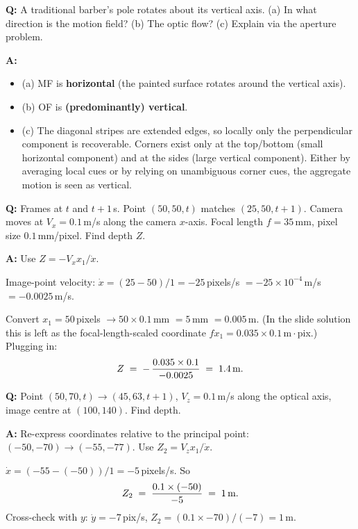 \begin{exbox}
\textbf{Q:} A traditional barber's pole rotates about its vertical axis. (a) In what direction is the motion field? (b) The optic flow? (c) Explain via the aperture problem.

\textbf{A:}
\begin{itemize}
  \item (a) MF is \textbf{horizontal} (the painted surface rotates around the vertical axis).
  \item (b) OF is \textbf{(predominantly) vertical}.
  \item (c) The diagonal stripes are extended edges, so locally only the perpendicular component is recoverable. Corners exist only at the top/bottom (small horizontal component) and at the sides (large vertical component). Either by averaging local cues or by relying on unambiguous corner cues, the aggregate motion is seen as vertical.
\end{itemize}
\end{exbox}

\begin{exbox}
\textbf{Q:} Frames at $t$ and $t+1$\,s. Point $(50,50,t)$ matches $(25,50,t+1)$. Camera moves at $V_x = 0.1$\,m/s along the camera $x$-axis. Focal length $f = 35$\,mm, pixel size $0.1$\,mm/pixel. Find depth $Z$.

\textbf{A:} Use $Z = -V_x x_1 / \dot{x}$.

Image-point velocity: $\dot{x} = (25 - 50)/1 = -25$\,pixels/s $= -25 \times 10^{-4}$\,m/s $= -0.0025$\,m/s.

Convert $x_1 = 50$\,pixels $\to 50 \times 0.1$\,mm $= 5$\,mm $= 0.005$\,m. (In the slide solution this is left as the focal-length-scaled coordinate $f x_1 = 0.035 \times 0.1$\,m\,$\cdot$\,pix.) Plugging in:
\[
Z \;=\; -\,\frac{0.035 \times 0.1}{-0.0025} \;=\; 1.4 \text{\,m}.
\]
\end{exbox}

\begin{exbox}
\textbf{Q:} Point $(50,70,t) \to (45,63,t+1)$, $V_z = 0.1$\,m/s along the optical axis, image centre at $(100,140)$. Find depth.

\textbf{A:} Re-express coordinates relative to the principal point: $(-50,-70) \to (-55,-77)$. Use $Z_2 = V_z x_1 / \dot{x}$.

$\dot{x} = (-55 - (-50))/1 = -5$\,pixels/s. So
\[
Z_2 \;=\; \frac{0.1 \times (-50)}{-5} \;=\; 1\text{\,m}.
\]
Cross-check with $y$: $\dot{y} = -7$\,pix/s, $Z_2 = (0.1 \times -70)/(-7) = 1$\,m. \checkmark
\end{exbox}

